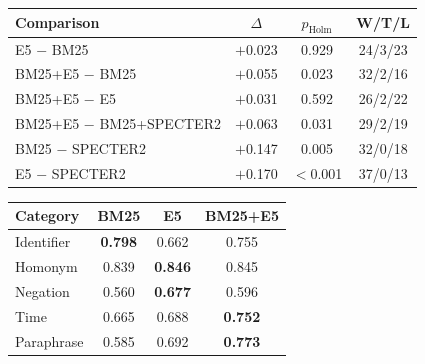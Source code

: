 \documentclass[10pt,a4paper]{article}
\begin{document}
\begin{table}[H]\centering\small
\begin{minipage}[t]{0.53\linewidth}\centering
{}\label{tab:sig}
\setlength{\tabcolsep}{4pt}
\begin{tabular}{@{}lccc@{}}
\toprule
Comparison & $\Delta$ & $p_{\text{Holm}}$ & W/T/L\\
\midrule
E5 $-$ BM25 & $+$0.023 & 0.929 & 24/3/23\\
BM25+E5 $-$ BM25 & $+$0.055 & 0.023 & 32/2/16\\
BM25+E5 $-$ E5 & $+$0.031 & 0.592 & 26/2/22\\
BM25+E5 $-$ BM25+SPECTER2 & $+$0.063 & 0.031 & 29/2/19\\
BM25 $-$ SPECTER2 & $+$0.147 & 0.005 & 32/0/18\\
E5 $-$ SPECTER2 & $+$0.170 & $<$0.001 & 37/0/13\\
\bottomrule
\end{tabular}
\end{minipage}\hfill
\begin{minipage}[t]{0.44\linewidth}\centering
{}\label{tab:cat}
\setlength{\tabcolsep}{4pt}
\begin{tabular}{@{}lccc@{}}
\toprule
Category & BM25 & E5 & BM25+E5\\
\midrule
Identifier & \textbf{0.798} & 0.662 & 0.755\\
Homonym & 0.839 & \textbf{0.846} & 0.845\\
Negation & 0.560 & \textbf{0.677} & 0.596\\
Time & 0.665 & 0.688 & \textbf{0.752}\\
Paraphrase & 0.585 & 0.692 & \textbf{0.773}\\
\bottomrule
\end{tabular}
\end{minipage}
\end{table}
\end{document}

